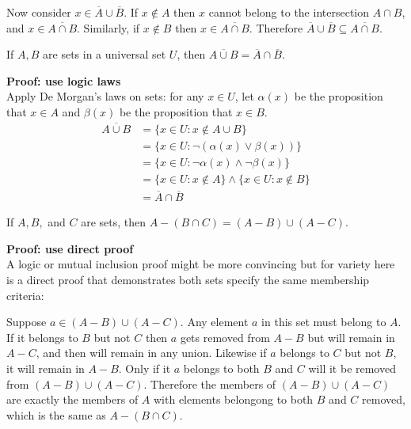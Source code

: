\documentclass{article}
\begin{document}
Now consider $x \in \overline{A} \cup \overline{B}$. If $x \not\in A$ then $x$ cannot belong to the intersection $A \cap B$, and $x \in \overline{A \cap B}$. Similarly, if $x \not\in B$ then $x \in \overline{A \cap B}$. Therefore $\overline{A} \cup \overline{B} \subseteq \overline{A \cap B}$.


\begin{problem}
If $A, B$ are sets in a universal set $U$, then $\overline{A \cup B} = \overline{A} \cap \overline{B}$.
\end{problem}
\textbf{Proof: use logic laws}
\\
Apply De Morgan's laws on sets: for any $x \in U$, let $\alpha(x)$ be the proposition that $x \in A$ and $\beta(x)$ be the proposition that $x \in B$.
\begin{align*}
  \overline{A \cup B} & = \{x \in U: x \not\in A \cup B\}                         \\
                      & = \{x \in U: \neg(\alpha(x) \lor \beta(x))\}              \\
                      & = \{x \in U: \neg\alpha(x) \land \neg\beta(x)\}           \\
                      & = \{x \in U: x \not\in A\} \land \{x \in U: x \not\in B\} \\
                      & = \overline{A} \cap \overline{B}
\end{align*}

\begin{problem}
If $A, B,$ and $C$ are sets, then $A - (B \cap C) = (A - B) \cup (A - C)$.
\end{problem}
\textbf{Proof: use direct proof}
\\

A logic or mutual inclusion proof might be more convincing but for variety here is a direct proof that demonstrates both sets specify the same membership criteria:

Suppose $a \in (A - B) \cup (A - C)$. Any element $a$ in this set must belong to $A$. If it belongs to $B$ but not $C$ then $a$ gets removed from $A - B$ but will remain in $A - C$, and then will remain in any union. Likewise if $a$ belongs to $C$ but not $B$, it will remain in $A - B$. Only if it $a$ belongs to both $B$ and $C$ will it be removed from $(A - B) \cup (A - C)$. Therefore the members of $(A - B) \cup (A - C)$ are exactly the members of $A$ with elements belongong to both $B$ and $C$ removed, which is the same as $A - (B \cap C)$.
\end{document}
